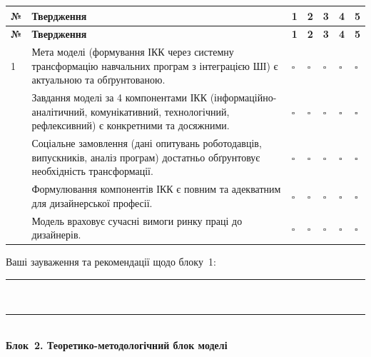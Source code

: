 \begin{longtable}{@{}p{}p{}p{}p{}p{}p{}p{}@{}}
\hline
\textbf{№} & \textbf{Твердження} & \textbf{1} & \textbf{2} & \textbf{3} & \textbf{4} & \textbf{5} \\
\hline
\endfirsthead
\hline
\textbf{№} & \textbf{Твердження} & \textbf{1} & \textbf{2} & \textbf{3} & \textbf{4} & \textbf{5} \\
\hline
\endhead
1 & Мета моделі (формування ІКК через системну трансформацію навчальних програм з інтеграцією ШІ) є актуальною та обґрунтованою. & $\square$ & $\square$ & $\square$ & $\square$ & $\square$ \\
\addlinespace
2 & Завдання моделі за 4 компонентами ІКК (інформаційно-аналітичний, комунікативний, технологічний, рефлексивний) є конкретними та досяжними. & $\square$ & $\square$ & $\square$ & $\square$ & $\square$ \\
\addlinespace
3 & Соціальне замовлення (дані опитувань роботодавців, випускників, аналіз програм) достатньо обґрунтовує необхідність трансформації. & $\square$ & $\square$ & $\square$ & $\square$ & $\square$ \\
\addlinespace
4 & Формулювання компонентів ІКК є повним та адекватним для дизайнерської професії. & $\square$ & $\square$ & $\square$ & $\square$ & $\square$ \\
\addlinespace
5 & Модель враховує сучасні вимоги ринку праці до дизайнерів. & $\square$ & $\square$ & $\square$ & $\square$ & $\square$ \\
\hline
\end{longtable}

Ваші зауваження та рекомендації щодо блоку~1:

\rule{\textwidth}{0.4pt}\\[0.3cm]
\rule{\textwidth}{0.4pt}\\[0.5cm]

\textbf{Блок~2. Теоретико-методологічний блок моделі}

